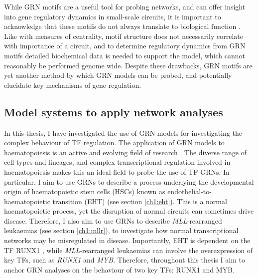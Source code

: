 While GRN motifs are a useful tool for probing networks, and can offer insight into gene regulatory dynamics in small-scale circuits, it is important to acknowledge that these motifs do not always translate to biological function \citep{ingram_network_2006}. Like with measures of centrality, motif structure does not necessarily correlate with importance of a circuit, and to determine regulatory dynamics from GRN motifs detailed biochemical data is needed to support the model, which cannot reasonably be performed genome wide. Despite these drawbacks, GRN motifs are yet another method by which GRN models can be probed, and potentially elucidate key mechanisms of gene regulation.


\subsection{Model systems to apply network analyses}

In this thesis, I have investigated the use of GRN models for investigating the complex behaviour of TF regulation. The application of GRN models to haematopoiesis is an active and evolving field of research \citep{rothenberg_how_2021}. The diverse range of cell types and lineages, and complex transcriptional regulation involved in haematopoiesis makes this an ideal field to probe the use of TF GRNs. In particular, I aim to use GRNs to describe a process underlying the developmental origin of haematopoietic stem cells (HSCs) known as endothelial-to-haematopoietic transition (EHT) \citep{bertrand_haematopoietic_2010, boisset_vivo_2010, kissa_blood_2010} (see section \ref{ch1:eht}). This is a normal haematopoietic process, yet the disruption of normal circuits can sometimes drive disease. Therefore, I also aim to use GRNs to describe \textit{MLL}-rearranged leukaemias (see section \ref{ch1:mllr}), to investigate how normal transcriptional networks may be misregulated in disease. Importantly, EHT is dependent on the TF RUNX1 \citep{okuda_aml1_1996, wang_disruption_1996, north_cbfa2_1999, cai_haploinsufficiency_2000, chen_runx1_2009}, while \textit{MLL}-rearranged leukaemias can involve the overexpression of key TFs, such as \textit{RUNX1} and \textit{MYB}. Therefore, throughout this thesis I aim to anchor GRN analyses on the behaviour of two key TFs: RUNX1 and MYB.



